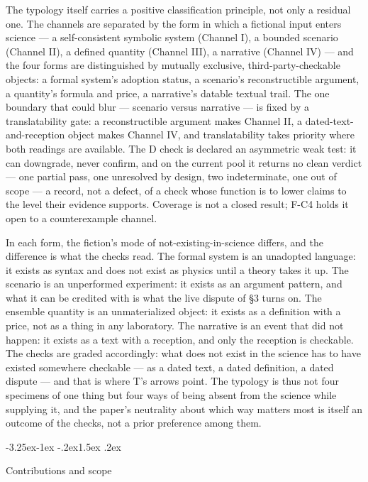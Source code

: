 \documentclass[11pt,a4paper]{article}
\makeatletter
\renewcommand\subsection{\@startsection{subsection}{2}{\z@}%
  {-3.25ex\@plus -1ex \@minus -.2ex}{1.5ex \@plus .2ex}%
  {\normalfont\large\bfseries\raggedright}}
\makeatother
\begin{document}
The typology itself carries a positive classification principle, not only a residual one. The channels are separated by the form in which a fictional input enters science — a self-consistent symbolic system (Channel I), a bounded scenario (Channel II), a defined quantity (Channel III), a narrative (Channel IV) — and the four forms are distinguished by mutually exclusive, third-party-checkable objects: a formal system's adoption status, a scenario's reconstructible argument, a quantity's formula and price, a narrative's datable textual trail. The one boundary that could blur — scenario versus narrative — is fixed by a translatability gate: a reconstructible argument makes Channel II, a dated-text-and-reception object makes Channel IV, and translatability takes priority where both readings are available. The D check is declared an asymmetric weak test: it can downgrade, never confirm, and on the current pool it returns no clean verdict — one partial pass, one unresolved by design, two indeterminate, one out of scope — a record, not a defect, of a check whose function is to lower claims to the level their evidence supports. Coverage is not a closed result; F-C4 holds it open to a counterexample channel.

In each form, the fiction's mode of not-existing-in-science differs, and the difference is what the checks read. The formal system is an unadopted language: it exists as syntax and does not exist as physics until a theory takes it up. The scenario is an unperformed experiment: it exists as an argument pattern, and what it can be credited with is what the live dispute of \S3 turns on. The ensemble quantity is an unmaterialized object: it exists as a definition with a price, not as a thing in any laboratory. The narrative is an event that did not happen: it exists as a text with a reception, and only the reception is checkable. The checks are graded accordingly: what does not exist in the science has to have existed somewhere checkable --- as a dated text, a dated definition, a dated dispute --- and that is where T's arrows point. The typology is thus not four specimens of one thing but four ways of being absent from the science while supplying it, and the paper's neutrality about which way matters most is itself an outcome of the checks, not a prior preference among them.

\subsection{Contributions and scope}
\end{document}
